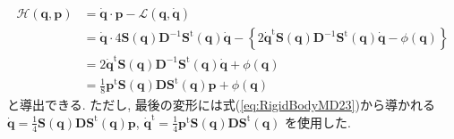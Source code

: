 \begin{align}
 \mathcal{H}(\bm{q},\bm{p})
 &=
 \dot{\bm{q}} \cdot \bm{p} - \mathcal{L}(\bm{q},\dot{\bm{q}})
 \\
 &=
 \dot{\bm{q}} \cdot
  4 \bm{S}(\bm{q}) \bm{D}^{-1} \bm{S}^{\mathrm{t}}(\bm{q})
 \dot{\bm{q}}
 - \left\{
 2 \dot{\bm{q}}^{\mathrm{t}} \bm{S}(\bm{q}) \bm{D}^{-1}
 \bm{S}^{\mathrm{t}}(\bm{q}) \dot{\bm{q}}
 - \phi(\bm{q})
 \right\}
 \\
 &=
 2 \dot{\bm{q}}^{\mathrm{t}} \bm{S}(\bm{q}) \bm{D}^{-1}
 \bm{S}^{\mathrm{t}}(\bm{q}) \dot{\bm{q}}
 + \phi(\bm{q})
 \\
 &=
 \frac{1}{8}
 \bm{p}^{\mathrm{t}} \bm{S}(\bm{q}) \bm{D}
 \bm{S}^{\mathrm{t}} (\bm{q}) \bm{p}
 + \phi(\bm{q})
\label{eq:RigidBodyMD24}
\end{align}
と導出できる. ただし, 最後の変形には式(\ref{eq:RigidBodyMD23})から導かれる
$\dot{\bm{q}}
 = \frac{1}{4} \bm{S}(\bm{q}) \bm{D}
 \bm{S}^{\mathrm{t}} (\bm{q}) \bm{p}$, 
$\dot{\bm{q}}^{\mathrm{t}}
 = \frac{1}{4} \bm{p}^{\mathrm{t}} \bm{S}(\bm{q})
 \bm{D} \bm{S}^{\mathrm{t}} (\bm{q})$
を使用した. 

